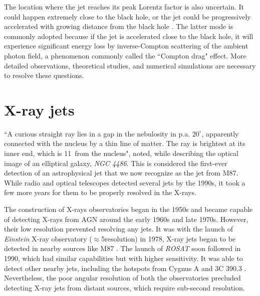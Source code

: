 The location where the jet reaches its peak Lorentz factor is also uncertain. It could happen extremely close to the black hole, or the jet could be progressively accelerated with growing distance from the black hole  \citep[see~][]{meier2003theory}. The latter mode is commonly adopted because if the jet is accelerated close to the black hole, it will experience significant energy loss by inverse-Compton scattering of the ambient photon field, a phenomenon commonly called the ``Compton drag" effect.
More detailed observations, theoretical studies, and numerical simulations are necessary to resolve these questions.

\section{X-ray jets\label{sec:xray_jets}}
``A curious straight ray lies in a gap in the nebulosity in p.a. $20^\circ$, apparently connected with the nucleus by a thin line of matter. The ray is brightest at its inner end, which is 11\as~from the nucleus", \citet{curtis1918descriptions} noted, while describing the optical image of an elliptical galaxy, \textit{NGC 4486}. This is considered the first-ever detection of an astrophysical jet that we now recognize as the jet from M87. While radio and optical telescopes detected several jets by the 1990s, it took a few more years for them to be properly resolved in the X-rays.

The construction of X-rays observatories began in the 1950s and became capable of detecting X-rays from AGN around the early 1960s and late 1970s. However, their low resolution prevented resolving any jets. It was with the launch of \textit{Einstein} X-ray observatory ($\approx$5\as resolution) in 1978, X-ray jets began to be detected in nearby sources like M87 \citep[][]{schreier1982high}. The launch of \textit{ROSAT} soon followed in 1990, which had similar capabilities but with higher sensitivity. It was able to detect other nearby jets, including the hotspots from Cygnus A and 3C 390.3 \citep{reynolds1996rosat,almudena1997extended}. Nevertheless, the poor angular resolution of both the observatories precluded detecting X-ray jets from distant sources, which require sub-second resolution.

